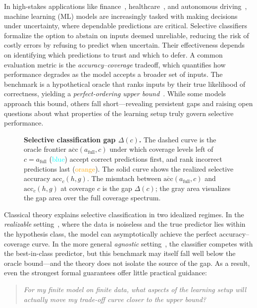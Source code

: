 In high-stakes applications like finance~\citep{9260038}, healthcare~\citep{guan2020bounded}, and autonomous driving~\citep{ghodsi2021generating}, machine learning (ML) models are increasingly tasked with making decisions under uncertainty, where dependable predictions are critical. Selective classifiers~\citep{chow1957optimum, el2010foundations} formalize the option to abstain on inputs deemed unreliable, reducing the risk of costly errors by refusing to predict when uncertain. Their effectiveness depends on identifying which predictions to trust and which to defer. A common evaluation metric is the \emph{accuracy–coverage} tradeoff, which quantifies how performance degrades as the model accepts a broader set of inputs. The benchmark is a hypothetical oracle that ranks inputs by their true likelihood of correctness, yielding a \emph{perfect-ordering upper bound}~\citep{geifman2018bias, rabanser2023training}. While some models approach this bound, others fall short—revealing persistent gaps and raising open questions about what properties of the learning setup truly govern selective performance.

\begin{figure}
\vspace{-5pt}
    \centering
    \resizebox{\linewidth}{!}{
    
    }
    \vspace{-12pt}
    \caption[Selective classification gap $\Delta(c)$.]{\textbf{Selective classification gap $\Delta(c)$.}  
      The dashed curve is the oracle frontier \(\overline{\mathrm{acc}}(a_{\text{full}},c)\) under which coverage levels left of \(c=a_{\text{full}}\) (\textcolor{Cyan}{blue}) accept correct predictions first, and rank incorrect predictions last (\textcolor{Orange}{orange}). The solid curve shows the realized selective accuracy \(\mathrm{acc}_{c}(h,g)\).  
      The mismtach between \(\overline{\mathrm{acc}}(a_{\text{full}},c)\) and \(\mathrm{acc}_{c}(h,g)\) at coverage $c$ is the gap \(\Delta(c)\);  
      the gray area visualizes the gap area over the full coverage spectrum.}
      \vspace{-25pt}
    \label{fig:bounds_overview}
\end{figure}

Classical theory explains selective classification in two idealized regimes. In the \emph{realizable} setting~\citep{el2010foundations}, where the data is noiseless and the true predictor lies within the hypothesis class, the model can asymptotically achieve the perfect accuracy–coverage curve. In the more general \emph{agnostic} setting~\citep{wiener2011agnostic}, the classifier competes with the best-in-class predictor, but this benchmark may itself fall well below the oracle bound—and the theory does not isolate the source of the gap. As a result, even the strongest formal guarantees offer little practical guidance:
\begin{quote}
\centering
\emph{For my finite model on finite data, what aspects of the learning setup will actually move my trade-off curve closer to the upper bound?}
\end{quote}

